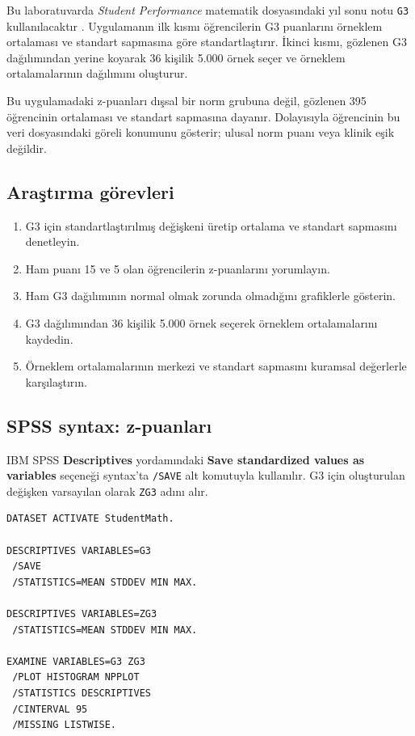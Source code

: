 Bu laboratuvarda \emph{Student Performance} matematik dosyasındaki yıl sonu
notu \texttt{G3} kullanılacaktır \cite{cortez2008data,cortezsilva2008}.
Uygulamanın ilk kısmı öğrencilerin G3 puanlarını örneklem ortalaması ve
standart sapmasına göre standartlaştırır. İkinci kısmı, gözlenen G3
dağılımından yerine koyarak 36 kişilik 5.000 örnek seçer ve örneklem
ortalamalarının dağılımını oluşturur.

\begin{researchbox}
Bu uygulamadaki z-puanları dışsal bir norm grubuna değil, gözlenen 395
öğrencinin ortalaması ve standart sapmasına dayanır. Dolayısıyla öğrencinin
bu veri dosyasındaki göreli konumunu gösterir; ulusal norm puanı veya klinik
eşik değildir.
\end{researchbox}

\subsection{Araştırma görevleri}

\begin{enumerate}
  \item G3 için standartlaştırılmış değişkeni üretip ortalama ve standart sapmasını denetleyin.
  \item Ham puanı 15 ve 5 olan öğrencilerin z-puanlarını yorumlayın.
  \item Ham G3 dağılımının normal olmak zorunda olmadığını grafiklerle gösterin.
  \item G3 dağılımından 36 kişilik 5.000 örnek seçerek örneklem ortalamalarını kaydedin.
  \item Örneklem ortalamalarının merkezi ve standart sapmasını kuramsal değerlerle karşılaştırın.
\end{enumerate}

\subsection{SPSS syntax: z-puanları}

IBM SPSS \textbf{Descriptives} yordamındaki \textbf{Save standardized values
as variables} seçeneği syntax'ta \texttt{/SAVE} alt komutuyla kullanılır.
G3 için oluşturulan değişken varsayılan olarak \texttt{ZG3} adını alır.

\begin{lstlisting}[language={}]
DATASET ACTIVATE StudentMath.

DESCRIPTIVES VARIABLES=G3
 /SAVE
 /STATISTICS=MEAN STDDEV MIN MAX.

DESCRIPTIVES VARIABLES=ZG3
 /STATISTICS=MEAN STDDEV MIN MAX.

EXAMINE VARIABLES=G3 ZG3
 /PLOT HISTOGRAM NPPLOT
 /STATISTICS DESCRIPTIVES
 /CINTERVAL 95
 /MISSING LISTWISE.
\end{lstlisting}

